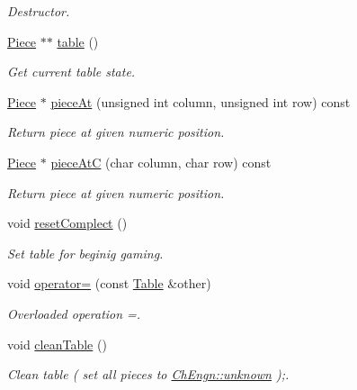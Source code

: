 \begin{DoxyCompactItemize}
\begin{DoxyCompactList}\small\item\em Destructor. \item\end{DoxyCompactList}\item 
\hyperlink{classChEngn_1_1Piece}{Piece} $\ast$$\ast$ \hyperlink{classChEngn_1_1Table_a7e403087a7979907ca171e20462f8346}{table} ()
\begin{DoxyCompactList}\small\item\em Get current table state. \item\end{DoxyCompactList}\item 
\hyperlink{classChEngn_1_1Piece}{Piece} $\ast$ \hyperlink{classChEngn_1_1Table_a5f797f91cf61269b04d19ede97875ba4}{pieceAt} (unsigned int column, unsigned int row) const 
\begin{DoxyCompactList}\small\item\em Return piece at given numeric position. \item\end{DoxyCompactList}\item 
\hyperlink{classChEngn_1_1Piece}{Piece} $\ast$ \hyperlink{classChEngn_1_1Table_a715d819b37f5cb853209ac36d06c8a89}{pieceAtC} (char column, char row) const 
\begin{DoxyCompactList}\small\item\em Return piece at given numeric position. \item\end{DoxyCompactList}\item 
void \hyperlink{classChEngn_1_1Table_a8ece9e9f9f28f209d72f16db0fb2aeed}{resetComplect} ()
\begin{DoxyCompactList}\small\item\em Set table for beginig gaming. \item\end{DoxyCompactList}\item 
void \hyperlink{classChEngn_1_1Table_a5b45cb67e40f75358145826e72b319b4}{operator=} (const \hyperlink{classChEngn_1_1Table}{Table} \&other)
\begin{DoxyCompactList}\small\item\em Overloaded operation =. \item\end{DoxyCompactList}\item 
\hypertarget{classChEngn_1_1Table_a2a563185ff7fdc60f90b10eb9930b821}{
void \hyperlink{classChEngn_1_1Table_a2a563185ff7fdc60f90b10eb9930b821}{cleanTable} ()}
\label{classChEngn_1_1Table_a2a563185ff7fdc60f90b10eb9930b821}

\begin{DoxyCompactList}\small\item\em Clean table ( set all pieces to \hyperlink{namespaceChEngn_a538ef441c024a7e5d4c1dedb5e03fc21}{ChEngn::unknown} );. \item\end{DoxyCompactList}\end{DoxyCompactItemize}
